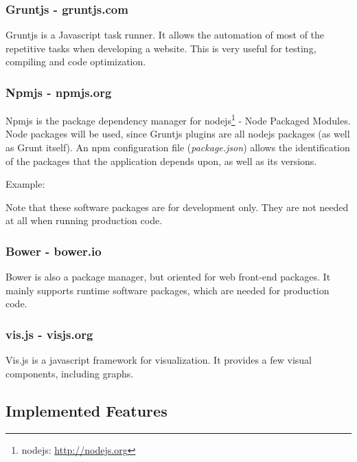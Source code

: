    \subsubsection{Gruntjs - gruntjs.com} %
      \label{ssub:gruntjs}
        Gruntjs is a Javascript task runner.
        It allows the automation of most of the repetitive tasks when developing a website.
        This is very useful for testing, compiling and code optimization.

    \subsubsection{Npmjs - npmjs.org} %
    \label{ssub:npm}
      Npmjs is the package dependency manager for nodejs\footnote{nodejs: \url{http://nodejs.org}} - Node Packaged Modules.
      Node packages will be used, since Gruntjs plugins are all nodejs packages (as well as Grunt itself).
      An npm configuration file (\emph{package.json}) allows the identification of the packages that the application depends upon, as well as its versions.

      Example: 

      

      Note that these software packages are for development only. They are not needed at all when running production code.

    \subsubsection{Bower - bower.io} %
    \label{ssub:bower}
    
    Bower is also a package manager, but oriented for web front-end packages.
    It mainly supports runtime software packages, which are needed for production code.


    \subsubsection{vis.js - visjs.org} %
    \label{ssub:visjs}
      Vis.js is a javascript framework for visualization.
      It provides a few visual components, including graphs.


  \subsection{Implemented Features} %
    \label{sub:main_features}
    
